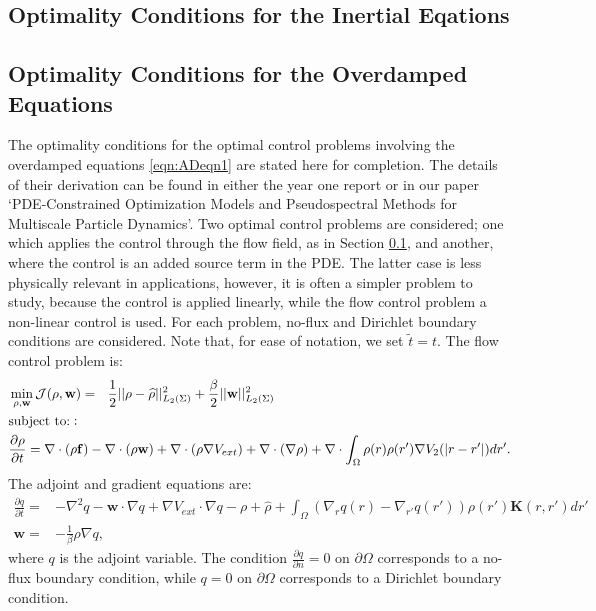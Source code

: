\documentclass[11pt, a4paper]{article}
\theoremstyle{definition}
\newcommand{\Sta}{\rho}
\newcommand{\Adjb}{q}
\newcommand{\Con}{\mathbf{f}}
\begin{document}
\subsection{Optimality Conditions for the Inertial Eqations} \label{sec:INOptimalityConditions}




\subsection{Optimality Conditions for the Overdamped Equations}
The optimality conditions for the optimal control problems involving the overdamped equations \eqref{eqn:ADeqn1} are stated here for completion. The details of their derivation can be found in either the year one report or in our paper `PDE-Constrained Optimization Models and Pseudospectral Methods for Multiscale Particle Dynamics'.
Two optimal control problems are considered; one which applies the control through the flow field, as in Section \ref{sec:INOptimalityConditions}, and another, where the control is an added source term in the PDE. The latter case is less physically relevant in applications, however, it is often a simpler problem to study, because the control is applied linearly, while the flow control problem a non-linear control is used. For each problem, no-flux and Dirichlet boundary conditions are considered. Note that, for ease of notation, we set $\tilde t = t$.
The flow control problem is:
\begin{align}
\label{eqn:ADFlowOCP}
&\min_{\Sta,\mathbf{w} } \mathcal J(\Sta,\mathbf{w} ) =\ \ \frac{1}{2}||\Sta - \widehat \Sta||_{L_2(\Sigma)}^2  +\frac{\beta}{2}||\mathbf{w}||_{L_2(\Sigma)}^2\\
& \text{subject to:}: \notag\\
&\frac{\partial \Sta}{\partial t} = \nabla \cdot (\Sta\Con) - \nabla \cdot (\Sta \mathbf{w})  + \nabla \cdot (\rho\nabla V_{ext}) + \nabla \cdot (\nabla \rho) +\nabla \cdot \int_\Omega \Sta(r)\Sta(r') \nabla V_2(|r-r'|)dr'. \notag
\end{align}
The adjoint and gradient equations are:
\begin{align*}
\frac{\partial \Adjb}{\partial t} =& - \nabla^2\Adjb - \mathbf{w} \cdot \nabla \Adjb + \nabla V_{ext} \cdot \nabla \Adjb - \Sta + \widehat \rho+\int_\Omega (\nabla_r \Adjb(r) - \nabla_{r'} \Adjb(r') ) \rho(r') \mathbf{K}(r,r') dr'\\
\mathbf{w} =& - \frac{1}{\beta} \Sta \nabla \Adjb,
\end{align*}
where $\Adjb$ is the adjoint variable. The condition $\frac{\partial \Adjb}{\partial n} = 0$ on $\partial \Omega$ corresponds to a no-flux boundary condition, while $\Adjb = 0$ on $\partial \Omega$ corresponds to a Dirichlet boundary condition.
\end{document}
